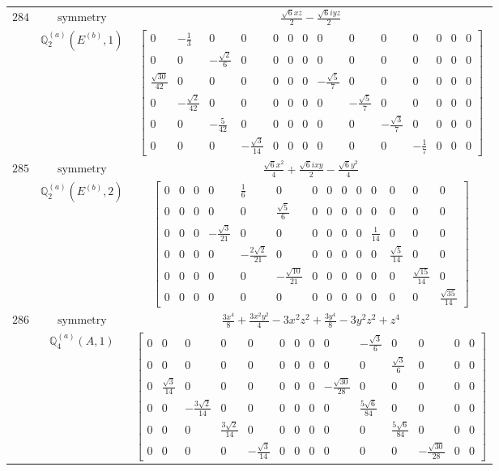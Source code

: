 \documentclass[fleqn,8pt,landscape]{jsarticle}
\begin{document}
\begin{longtable}{ccc}
$ 284 $ & $ \text{symmetry} $ & $ \frac{\sqrt{6} x z}{2} - \frac{\sqrt{6} i y z}{2} $ \\
$  $ & $ \mathbb{Q}_{2}^{(a)}(E^{(b)},1) $ & $ \begin{bmatrix} 0 & - \frac{1}{3} & 0 & 0 & 0 & 0 & 0 & 0 & 0 & 0 & 0 & 0 & 0 & 0 \\ 0 & 0 & - \frac{\sqrt{2}}{6} & 0 & 0 & 0 & 0 & 0 & 0 & 0 & 0 & 0 & 0 & 0 \\ \frac{\sqrt{30}}{42} & 0 & 0 & 0 & 0 & 0 & 0 & - \frac{\sqrt{5}}{7} & 0 & 0 & 0 & 0 & 0 & 0 \\ 0 & - \frac{\sqrt{2}}{42} & 0 & 0 & 0 & 0 & 0 & 0 & - \frac{\sqrt{5}}{7} & 0 & 0 & 0 & 0 & 0 \\ 0 & 0 & - \frac{5}{42} & 0 & 0 & 0 & 0 & 0 & 0 & - \frac{\sqrt{3}}{7} & 0 & 0 & 0 & 0 \\ 0 & 0 & 0 & - \frac{\sqrt{3}}{14} & 0 & 0 & 0 & 0 & 0 & 0 & - \frac{1}{7} & 0 & 0 & 0 \end{bmatrix} $ \\ \hline
$ 285 $ & $ \text{symmetry} $ & $ \frac{\sqrt{6} x^{2}}{4} + \frac{\sqrt{6} i x y}{2} - \frac{\sqrt{6} y^{2}}{4} $ \\
$  $ & $ \mathbb{Q}_{2}^{(a)}(E^{(b)},2) $ & $ \begin{bmatrix} 0 & 0 & 0 & 0 & \frac{1}{6} & 0 & 0 & 0 & 0 & 0 & 0 & 0 & 0 & 0 \\ 0 & 0 & 0 & 0 & 0 & \frac{\sqrt{5}}{6} & 0 & 0 & 0 & 0 & 0 & 0 & 0 & 0 \\ 0 & 0 & 0 & - \frac{\sqrt{3}}{21} & 0 & 0 & 0 & 0 & 0 & 0 & \frac{1}{14} & 0 & 0 & 0 \\ 0 & 0 & 0 & 0 & - \frac{2 \sqrt{2}}{21} & 0 & 0 & 0 & 0 & 0 & 0 & \frac{\sqrt{5}}{14} & 0 & 0 \\ 0 & 0 & 0 & 0 & 0 & - \frac{\sqrt{10}}{21} & 0 & 0 & 0 & 0 & 0 & 0 & \frac{\sqrt{15}}{14} & 0 \\ 0 & 0 & 0 & 0 & 0 & 0 & 0 & 0 & 0 & 0 & 0 & 0 & 0 & \frac{\sqrt{35}}{14} \end{bmatrix} $ \\ \hline
$ 286 $ & $ \text{symmetry} $ & $ \frac{3 x^{4}}{8} + \frac{3 x^{2} y^{2}}{4} - 3 x^{2} z^{2} + \frac{3 y^{4}}{8} - 3 y^{2} z^{2} + z^{4} $ \\
$  $ & $ \mathbb{Q}_{4}^{(a)}(A,1) $ & $ \begin{bmatrix} 0 & 0 & 0 & 0 & 0 & 0 & 0 & 0 & 0 & - \frac{\sqrt{3}}{6} & 0 & 0 & 0 & 0 \\ 0 & 0 & 0 & 0 & 0 & 0 & 0 & 0 & 0 & 0 & \frac{\sqrt{3}}{6} & 0 & 0 & 0 \\ 0 & \frac{\sqrt{3}}{14} & 0 & 0 & 0 & 0 & 0 & 0 & - \frac{\sqrt{30}}{28} & 0 & 0 & 0 & 0 & 0 \\ 0 & 0 & - \frac{3 \sqrt{2}}{14} & 0 & 0 & 0 & 0 & 0 & 0 & \frac{5 \sqrt{6}}{84} & 0 & 0 & 0 & 0 \\ 0 & 0 & 0 & \frac{3 \sqrt{2}}{14} & 0 & 0 & 0 & 0 & 0 & 0 & \frac{5 \sqrt{6}}{84} & 0 & 0 & 0 \\ 0 & 0 & 0 & 0 & - \frac{\sqrt{3}}{14} & 0 & 0 & 0 & 0 & 0 & 0 & - \frac{\sqrt{30}}{28} & 0 & 0 \end{bmatrix} $ \\ \hline

\end{longtable}
\end{document}
